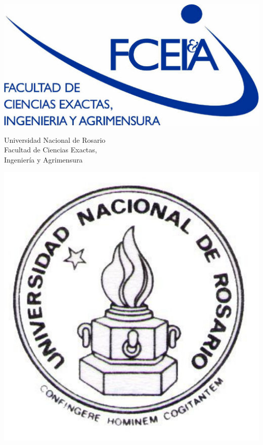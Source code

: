\documentclass[12pt]{article}
\begin{document}
\begin{titlepage}

\begin{minipage}{2.6cm}
\includegraphics[width=\textwidth]{fceia.pdf}
\end{minipage}
\hfill
%
\begin{minipage}{6cm}
\begin{center}
\normalsize{Universidad Nacional de Rosario\\
Facultad de Ciencias Exactas,\\
Ingeniería y Agrimensura\\}
\end{center}
\end{minipage}
\hspace{0.5cm}
\hfill
\begin{minipage}{2.6cm}
\includegraphics[width=\textwidth]{unr.pdf}
\end{minipage}


\end{titlepage}
\end{document}
